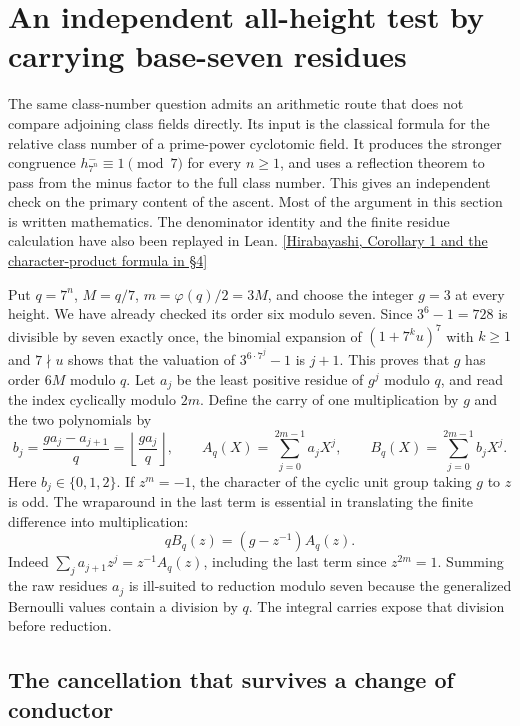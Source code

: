 \documentclass[12pt,letterpaper]{article}
\begin{document}
\section{An independent all-height test by carrying base-seven residues}
\label{sec:seven-carries}

The same class-number question admits an arithmetic route that does not compare adjoining class fields directly. Its input is the classical formula for the relative class number of a prime-power cyclotomic field. It produces the stronger congruence \(h^-_{7^n}\equiv1\pmod7\) for every \(n\ge1\), and uses a reflection theorem to pass from the minus factor to the full class number. This gives an independent check on the primary content of the ascent. Most of the argument in this section is written mathematics. The denominator identity and the finite residue calculation have also been replayed in Lean. \href{https://cm.osu.cz/sites/default/files/contents/22-2/cm022-2014-2_133-140.pdf}{[Hirabayashi, Corollary 1 and the character-product formula in \S4]}

Put \(q=7^n\), \(M=q/7\), \(m=\varphi(q)/2=3M\), and choose the integer \(g=3\) at every height. We have already checked its order six modulo seven. Since \(3^6-1=728\) is divisible by seven exactly once, the binomial expansion of \((1+7^k u)^7\) with \(k\ge1\) and \(7\nmid u\) shows that the valuation of \(3^{6\cdot7^j}-1\) is \(j+1\). This proves that \(g\) has order \(6M\) modulo \(q\). Let \(a_j\) be the least positive residue of \(g^j\) modulo \(q\), and read the index cyclically modulo \(2m\). Define the carry of one multiplication by \(g\) and the two polynomials by
\[
 b_j=\frac{g a_j-a_{j+1}}q=\left\lfloor\frac{g a_j}{q}\right\rfloor,
 \qquad A_q(X)=\sum_{j=0}^{2m-1}a_jX^j,\qquad
 B_q(X)=\sum_{j=0}^{2m-1}b_jX^j .
\]
Here \(b_j\in\{0,1,2\}\). If \(z^m=-1\), the character of the cyclic unit group taking \(g\) to \(z\) is odd. The wraparound in the last term is essential in translating the finite difference into multiplication:
\[
 q B_q(z)=(g-z^{-1})A_q(z).
\]
Indeed \(\sum_j a_{j+1}z^j=z^{-1}A_q(z)\), including the last term since \(z^{2m}=1\). Summing the raw residues \(a_j\) is ill-suited to reduction modulo seven because the generalized Bernoulli values contain a division by \(q\). The integral carries expose that division before reduction.

\subsection{The cancellation that survives a change of conductor}
\end{document}
